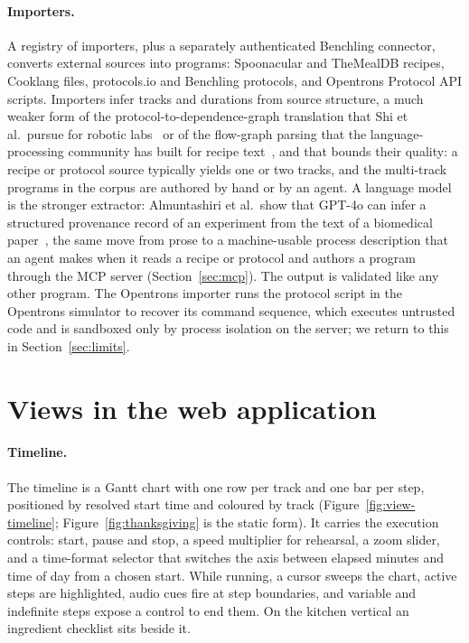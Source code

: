 \documentclass[10pt]{article}
\begin{document}
\paragraph{Importers.} A registry of importers, plus a separately authenticated Benchling connector, converts external sources into programs: Spoonacular and TheMealDB recipes, Cooklang files, protocols.io and Benchling protocols, and Opentrons Protocol API scripts. Importers infer tracks and durations from source structure, a much weaker form of the protocol-to-dependence-graph translation that Shi et al.\ pursue for robotic labs~\cite{shi2024protocol} or of the flow-graph parsing that the language-processing community has built for recipe text~\cite{mori2014flowgraph,kiddon2015mise}, and that bounds their quality: a recipe or protocol source typically yields one or two tracks, and the multi-track programs in the corpus are authored by hand or by an agent. A language model is the stronger extractor: Almuntashiri et al.\ show that GPT-4o can infer a structured provenance record of an experiment from the text of a biomedical paper~\cite{almuntashiri2025provenance}, the same move from prose to a machine-usable process description that an agent makes when it reads a recipe or protocol and authors a program through the MCP server (Section~\ref{sec:mcp}). The output is validated like any other program. The Opentrons importer runs the protocol script in the Opentrons simulator to recover its command sequence, which executes untrusted code and is sandboxed only by process isolation on the server; we return to this in Section~\ref{sec:limits}.

\section{Views in the web application}
\label{sec:views}

\paragraph{Timeline.} The timeline is a Gantt chart with one row per track and one bar per step, positioned by resolved start time and coloured by track (Figure~\ref{fig:view-timeline}; Figure~\ref{fig:thanksgiving} is the static form). It carries the execution controls: start, pause and stop, a speed multiplier for rehearsal, a zoom slider, and a time-format selector that switches the axis between elapsed minutes and time of day from a chosen start. While running, a cursor sweeps the chart, active steps are highlighted, audio cues fire at step boundaries, and variable and indefinite steps expose a control to end them. On the kitchen vertical an ingredient checklist sits beside it.
\end{document}
